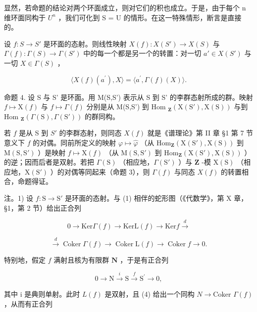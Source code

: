 显然，若命题的结论对两个环面成立，则对它们的积也成立。于是，由于每个 n 维环面同构于 \(U^{n}\) ，我们可化到 S = U 的情形。在这一特殊情形，断言是直接的。

设 \(f: S \to S'\) 是环面的态射。则线性映射 \(X(f): X(S') \to X(S)\) 与 \(\Gamma(f): \Gamma(S) \to \Gamma(S')\) 中的每一个都是另一个的转置：对一切 \(a' \in X(S')\) 与一切 \(X \in \Gamma(S)\) ，

\[
\langle X (f) (a ^ {\prime}), X \rangle = \langle a ^ {\prime}, \Gamma (f) (X) \rangle .\tag{3}
\]

命题 4. 设 S 与 S' 是环面。用 M(S,S') 表示从 S 到 S' 的李群态射所成的群。映射 \(f \mapsto \mathrm{X}(f)\) 与 \(f \mapsto \Gamma(f)\) 分别是从 M(S,S') 到 Hom \(_{\mathbf{Z}}(\mathrm{X}(\mathrm{S}'),\mathrm{X}(\mathrm{S}))\) 与到 Hom \(_{\mathbf{Z}}(\Gamma(\mathrm{S}),\Gamma(\mathrm{S}'))\) 的群同构。

若 \(f\) 是从 S 到 \(S'\) 的李群态射，则同态 \(X(f)\) 就是《谱理论》第 II 章 §1 第 7 节意义下 \(f\) 的对偶。同前所定义的映射 \(\varphi \mapsto \hat{\varphi}\) （从 \(\mathrm{Hom}_{\mathbf{Z}}(\mathrm{X}(\mathrm{S}'), \mathrm{X}(\mathrm{S}))\) 到 \(\mathrm{M}(\mathrm{S},\mathrm{S}')\) ）是映射 \(f \mapsto \mathrm{X}(f)\) （从 \(\mathrm{M}(\mathrm{S},\mathrm{S}')\) 到 \(\mathrm{Hom}_{\mathbf{Z}}(\mathrm{X}(\mathrm{S}'), \mathrm{X}(\mathrm{S}))\) ）的逆；因而后者是双射。若把 \(\Gamma(\mathrm{S})\) （相应地，\(\Gamma(\mathrm{S}')\) ）与 \(\mathbf{Z}\) -模 \(\mathrm{X}(\mathrm{S})\) （相应地，\(\mathrm{X}(\mathrm{S}')\) ）的对偶等同起来（命题 3），则 \(\Gamma(f)\) 与同态 \(X(f)\) 的转置相合，命题得证。

注。1) 设 \(f: \mathrm{S} \to \mathrm{S}'\) 是环面的态射。与 (1) 相伴的蛇形图（《代数学》，第 X 章，§1，第 2 节）给出正合列

\[
0 \longrightarrow \mathrm{Ker} \Gamma (f) \longrightarrow \mathrm{KerL} (f) \longrightarrow \mathrm{Ker} f \stackrel {d} {\longrightarrow}\tag{4}
\]

\[
\stackrel {{d}} {{\longrightarrow}} \operatorname{Coker} \Gamma (f) \longrightarrow \operatorname{Coker} \mathrm{L} (f) \longrightarrow \operatorname{Coker} f \longrightarrow 0.
\]

特别地，假定 \(f\) 满射且核为有限群 \(\mathbf{N}\) ，于是有正合列

\[
0 \longrightarrow \mathrm{N} \stackrel {i} {\longrightarrow} \mathrm{S} \stackrel {f} {\longrightarrow} \mathrm{S} ^ {\prime} \longrightarrow 0,
\]

其中 i 是典则单射。此时 \(L(f)\) 是双射，且 (4) 给出一个同构 \(N \to \text{Coker } \Gamma(f)\) ，从而有正合列

